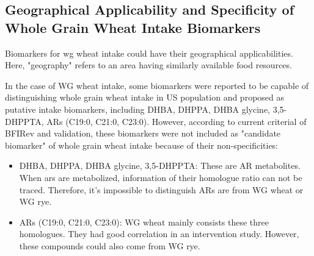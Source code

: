 \subsection{Geographical Applicability and Specificity of Whole Grain Wheat Intake Biomarkers}
Biomarkers for \acrshort{wg} wheat intake could have their geographical applicabilities.
Here, "geography" refers to an area having similarly available food resources.

In the case of WG wheat intake, some biomarkers were reported to be capable of distinguishing whole grain wheat intake in US population and proposed as putative intake biomarkers, including DHBA, DHPPA, DHBA glycine, 3,5-DHPPTA\cite{ISI:000330080500002}, ARs (C19:0, C21:0, C23:0)\cite{ISI:000374112900032}. However, according to current criterial of BFIRev\cite{Pratico2018} and validation\cite{LarsValidation}, these biomarkers were not included as "candidate biomarker" of whole grain wheat intake because of their non-specificities:
\begin{itemize}
	\item DHBA, DHPPA, DHBA glycine, 3,5-DHPPTA: These are AR metabolites. When \acrlong{ars} are metabolized, information of their homologue ratio can not be traced. Therefore, it's impossible to distinguish ARs are from WG wheat or WG rye.
	\item ARs (C19:0, C21:0, C23:0): WG wheat mainly consists these three homologues. They had good correlation in an intervention study\cite{ISI:000374112900032}. However, these compounds could also come from WG rye.
\end{itemize}

